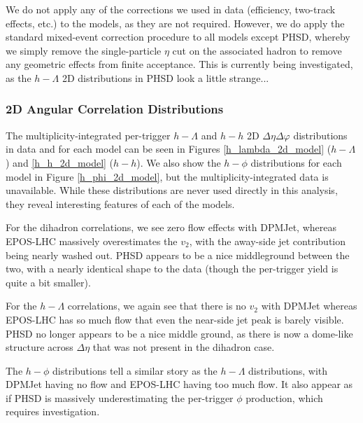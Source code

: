 \documentclass[ALICE,manyauthors]{ALICE_analysis_notes}
\begin{document}
We do not apply any of the corrections we used in data (efficiency, two-track effects, etc.) to the models, as they are not required. However, we do apply the standard mixed-event correction procedure to all models except PHSD, whereby we simply remove the single-particle $\eta$ cut on the associated hadron to remove any geometric effects from finite acceptance. This is currently being investigated, as the $h-\Lambda$ 2D distributions in PHSD look a little strange...

\subsubsection{2D Angular Correlation Distributions}
\label{model_2d_correlations}

The multiplicity-integrated per-trigger $h-\Lambda$ and $h-h$ 2D $\Delta\eta\Delta\varphi$ distributions in data and for each model can be seen in Figures \ref{h_lambda_2d_model} ($h-\Lambda$) and \ref{h_h_2d_model} ($h-h$). We also show the $h-\phi$ distributions for each model in Figure \ref{h_phi_2d_model}, but the multiplicity-integrated data is unavailable. While these distributions are never used directly in this analysis, they reveal interesting features of each of the models. 

For the dihadron correlations, we see zero flow effects with DPMJet, whereas EPOS-LHC massively overestimates the $v_{2}$, with the away-side jet contribution being nearly washed out. PHSD appears to be a nice middleground between the two, with a nearly identical shape to the data (though the per-trigger yield is quite a bit smaller).

For the $h-\Lambda$ correlations, we again see that there is no $v_{2}$ with DPMJet whereas EPOS-LHC has so much flow that even the near-side jet peak is barely visible. PHSD no longer appears to be a nice middle ground, as there is now a dome-like structure across $\Delta\eta$ that was not present in the dihadron case. 

The $h-\phi$ distributions tell a similar story as the $h-\Lambda$ distributions, with DPMJet having no flow and EPOS-LHC having too much flow. It also appear as if PHSD is massively underestimating the per-trigger $\phi$ production, which requires investigation.
\end{document}
